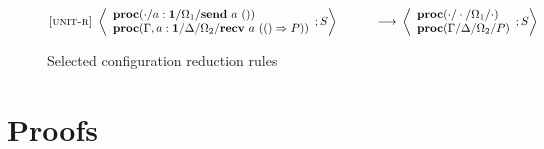 \documentclass[12pt, openany]{memoir}
\newcommand*{\send}[2]{\textbf{send}\ #1\ #2}
\newcommand*{\recv}[2]{\textbf{recv}\ #1\ #2}
\newcommand*{\procObj}[4]{\textbf{proc}(#1/#2/#3/#4)}
\begin{document}
\begin{figure}[H]
  \begin{alignat}{4}
    \label{unit-reduction-r} \textsc{[unit-r]} & ~ 
    \Braket{
      \begin{array}{l}
        \procObj{\cdot}{a : \textbf{1}}{\Omega_1}{\send{a}{()}} \\
        \procObj{\Gamma, a : \textbf{1}}{\Delta}{\Omega_2}{\recv{a}{(() \Rightarrow P)}}
      \end{array}
      ; S
    } \tag*{} & ~ \longrightarrow & ~ 
    \Braket{
      \begin{array}{l}
        \procObj{\cdot}{\cdot}{\Omega_1}{\cdot} \\
        \procObj{\Gamma}{\Delta}{\Omega_2}{P}
      \end{array}
      ; S
    }
  \end{alignat}
  \raggedleft
  \caption{Selected configuration reduction rules}
  \label{fig:stdreduction}
\end{figure}

\appendix

\chapter{Proofs}

\backmatter

\printbibliography
\end{document}
